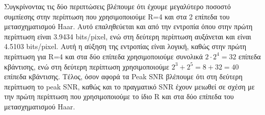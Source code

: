 \documentclass{article}
\begin{document}
	\noindent
	Συγκρίνοντας τις δύο περιπτώσεις βλέπουμε ότι έχουμε μεγαλύτερο ποσοστό συμπίεσης στην περίπτωση που χρησιμοποιούμε R=4 και στα 2 επίπεδα του μετασχηματισμού Haar. Αυτό επαληθεύεται και από την εντροπία όπου στην πρώτη περίπτωση είναι 3.9434 bits/pixel, ενώ στη δεύτερη περίπτωση αυξάνεται και είναι 4.5103 bits/pixel. Αυτή η αύξηση της εντροπίας είναι λογική, καθώς στην πρώτη περίπτωση για R=4 και στα δύο επίπεδα χρησιμοποιούμε συνολικά $2 \cdot 2^4 = 32$ επίπεδα κβάντισης, ενώ στη δεύτερη περίπτωση χρησιμοποιούμε  $2^3 + 2^5 = 8 + 32 = 40$ επίπεδα κβάντισης. Τέλος, όσον αφορά τα Peak SNR βλέπουμε ότι στη δεύτερη περίπτωση το peak SNR, καθώς και το πραγματικό SNR έχουν μειωθεί σε σχέση με την πρώτη περίπτωση που χρησιμοποιούμε το ίδιο R και στα δύο επίπεδα του μετασχηματισμού Haar.
\end{document}
